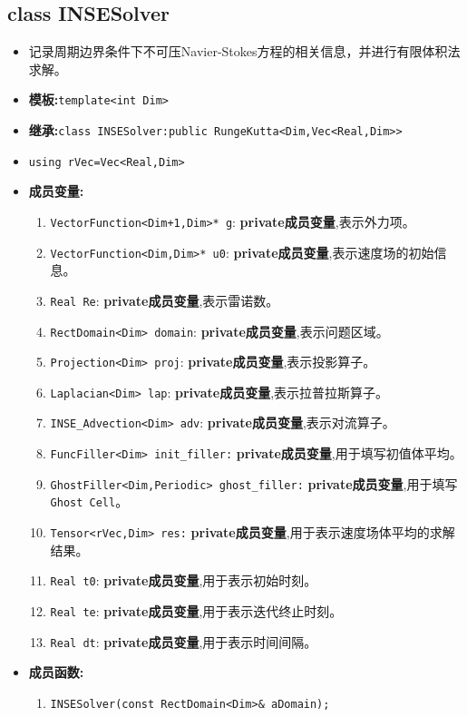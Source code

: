 \documentclass[UTF8]{ctexart}
\theoremstyle{plain}
\theoremstyle{definition}
\theoremstyle{remark}
\begin{document}
\subsection{class INSESolver}
\begin{itemize}
    \item 记录周期边界条件下不可压Navier-Stokes方程的相关信息，并进行有限体积法求解。
    \item \textbf{模板:}\texttt{template<int Dim>}
    \item \textbf{继承:}\texttt{class INSESolver:public RungeKutta<Dim,Vec<Real,Dim>>}
    \item \texttt{using rVec=Vec<Real,Dim>}
    \item \textbf{成员变量:}
    \begin{enumerate}
        \item \texttt{VectorFunction<Dim+1,Dim>* g}: \textbf{private成员变量},表示外力项。
        \item \texttt{VectorFunction<Dim,Dim>* u0}: \textbf{private成员变量},表示速度场的初始信息。
        \item \texttt{Real Re}: \textbf{private成员变量},表示雷诺数。
        \item \texttt{RectDomain<Dim> domain}: \textbf{private成员变量},表示问题区域。
        \item \texttt{Projection<Dim> proj}: \textbf{private成员变量},表示投影算子。
        \item \texttt{Laplacian<Dim> lap}: \textbf{private成员变量},表示拉普拉斯算子。
        \item \texttt{INSE\_Advection<Dim> adv}: \textbf{private成员变量},表示对流算子。
        \item \texttt{FuncFiller<Dim> init\_filler:} \textbf{private成员变量},用于填写初值体平均。
        \item \texttt{GhostFiller<Dim,Periodic> ghost\_filler:} \textbf{private成员变量},用于填写\texttt{Ghost Cell}。
        \item \texttt{Tensor<rVec,Dim> res:} \textbf{private成员变量},用于表示速度场体平均的求解结果。
        \item \texttt{Real t0}: \textbf{private成员变量},用于表示初始时刻。
        \item \texttt{Real te}: \textbf{private成员变量},用于表示迭代终止时刻。
        \item \texttt{Real dt}: \textbf{private成员变量},用于表示时间间隔。
    \end{enumerate}
    \item \textbf{成员函数:}
    \begin{enumerate}
        \item \texttt{INSESolver(const RectDomain<Dim>\& aDomain);}
        

\end{enumerate}
\end{itemize}
\end{document}
